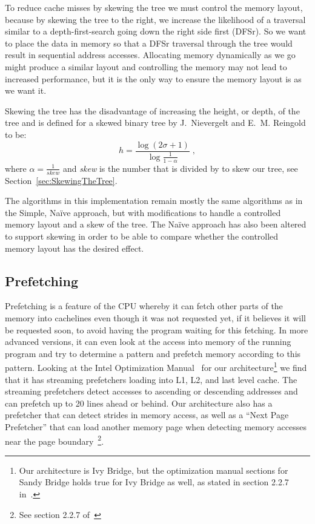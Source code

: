 To reduce cache misses by skewing the tree we must control the memory layout, because by skewing the tree to the right, we increase the likelihood of a traversal similar to a depth-first-search going down the right side first (DFSr). So we want to place the data in memory so that a DFSr traversal through the tree would result in sequential address accesses.
Allocating memory dynamically as we go might produce a similar layout and controlling the memory may not lead to increased performance, but it is the only way to ensure the memory layout is as we want it.

Skewing the tree has the disadvantage of increasing the height, or depth, of the tree 
and is defined for a skewed binary tree by J.~Nievergelt and E.~M. Reingold~ to be:
\[ h = \frac{\log(2\sigma+1)}{ \log\frac{1}{1-\alpha}}\;,\]
where $\alpha = \frac{1}{\mathit{skew}}$ and \textit{skew} is the number that is divided by to skew our tree, see Section~\ref{sec:SkewingTheTree}.

The algorithms in this implementation remain mostly the same algorithms as in the Simple, Naïve approach, but with modifications to handle a controlled memory layout and a skew of the tree.
The Naïve approach has also been altered to support skewing in order to be able to compare whether the controlled memory layout has the desired effect.

\subsection{Prefetching}
Prefetching is a feature of the CPU whereby it can fetch other parts of the memory into cachelines even though it was not requested yet, if it believes it will be requested soon, to avoid having the program waiting for this fetching.
In more advanced versions, it can even look at the access into memory of the running program and try to determine a pattern and prefetch memory according to this pattern.
Looking at the Intel Optimization Manual~ for our architecture\footnote{Our architecture is Ivy Bridge, but the optimization manual sections for Sandy Bridge holds true for Ivy Bridge as well, as stated in section 2.2.7 in~.} we find that it has streaming prefetchers loading into L1, L2, and last level cache. The streaming prefetchers detect accesses to ascending or descending addresses and can prefetch up to 20 lines ahead or behind. 
Our architecture also has a prefetcher that can detect strides in memory access, as well as a “Next Page Prefetcher” that can load another memory page when detecting memory accesses near the page boundary~\footnote{See section 2.2.7 of~}.


